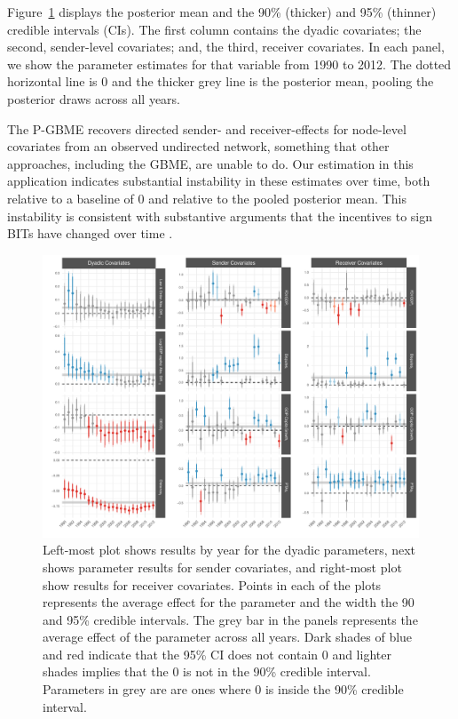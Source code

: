 \documentclass[a4paper, 12pt]{article}
\begin{document}
Figure~\ref{fig:coef} displays the posterior mean and the 90\% (thicker) and 95\% (thinner)  credible intervals (CIs). The first column contains the dyadic covariates; the second, sender-level covariates; and, the third, receiver covariates. In each panel, we show the parameter estimates for that variable from 1990 to 2012.  The dotted horizontal line is $0$ and the thicker grey line is the posterior mean, pooling the posterior draws across all years.   

The P-GBME recovers directed sender- and receiver-effects for node-level covariates from an observed undirected network, something that other approaches, including the GBME, are unable to do. Our estimation in this application indicates substantial instability in these estimates over time, both relative to a baseline of $0$ and relative to the pooled posterior mean.  This instability is consistent with substantive arguments that the incentives to sign BITs have changed over time \citep{jandhyala:etal:2011}. 

\begin{figure}[ht]
  \centering
  \includegraphics[width=1\textwidth]{figureA3.pdf}
  \caption{Left-most plot shows results by year for the dyadic parameters, next shows parameter results for sender covariates, and right-most plot show results for receiver covariates. Points in each of the plots represents the average effect for the parameter and the width the 90 and 95\% credible intervals. The grey bar in the panels represents the average effect of the parameter across all years. Dark shades of blue and red indicate that the 95\% CI does not contain 0 and lighter shades implies that the $0$ is not in the 90\% credible interval. Parameters in grey are are ones where 0 is inside the 90\% credible interval.} 
  \label{fig:coef}
\end{figure}
\end{document}
